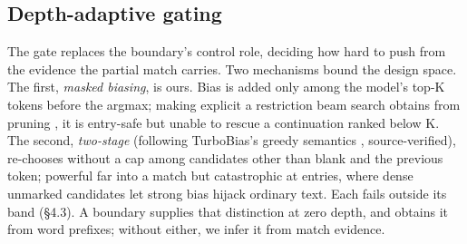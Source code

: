 \documentclass{article}
\begin{document}





\subsection{Depth-adaptive gating}

The gate replaces the boundary's control role, deciding how hard to push from the evidence the partial match carries. Two mechanisms bound the design space. The first, \textit{masked biasing}, is ours. Bias is added only among the model's top-K tokens before the argmax; making explicit a restriction beam search obtains from pruning \cite{zhao19d_interspeech}, it is entry-safe but unable to rescue a continuation ranked below K. The second, \textit{two-stage} (following TurboBias's greedy semantics \cite{andrusenko2025turbobias}, source-verified), re-chooses without a cap among candidates other than blank and the previous token; powerful far into a match but catastrophic at entries, where dense unmarked candidates let strong bias hijack ordinary text. Each fails outside its band (§4.3). A boundary supplies that distinction at zero depth, and \cite{zhao19d_interspeech} obtains it from word prefixes; without either, we infer it from match evidence.

\end{document}
